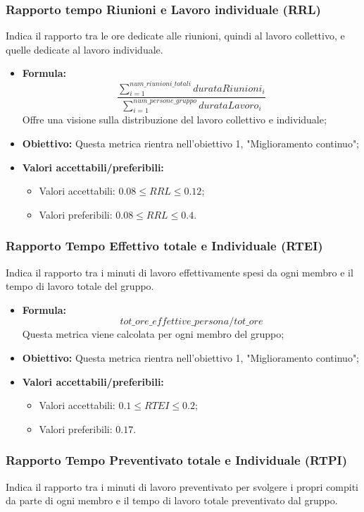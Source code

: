 \subsubsection{Rapporto tempo Riunioni e Lavoro individuale (RRL)}
Indica il rapporto tra le ore dedicate alle riunioni, quindi al lavoro collettivo, e quelle dedicate al lavoro individuale.
\begin{itemize}
	\item \textbf{Formula:}\[\dfrac{\sum_{i=1}^{num\_riunioni\_totali} durataRiunioni_i}{\sum_{i=1}^{num\_persone\_gruppo} durataLavoro_i}\]
	Offre una visione sulla distribuzione del lavoro collettivo e individuale;
	\item \textbf{Obiettivo:} Questa metrica rientra nell'obiettivo 1, "Miglioramento continuo";
	\item \textbf{Valori accettabili/preferibili: }
		\begin{itemize}
			\item Valori accettabili: $0.08 \leq RRL \leq 0.12$;
			\item Valori preferibili: $0.08 \leq RRL \leq 0.4$.
		\end{itemize}
\end{itemize}

\subsubsection{Rapporto Tempo Effettivo totale e Individuale (RTEI)}
Indica il rapporto tra i minuti di lavoro effettivamente spesi da ogni membro e il tempo di lavoro totale del gruppo.
\begin{itemize}
	\item \textbf{Formula:}\[tot\_ore\_effettive\_persona / tot\_ore
	\]Questa metrica viene calcolata per ogni membro del gruppo;
	\item \textbf{Obiettivo:} Questa metrica rientra nell'obiettivo 1, "Miglioramento continuo";
	\item \textbf{Valori accettabili/preferibili: }
	\begin{itemize}
		\item Valori accettabili: $0.1 \leq RTEI \leq 0.2$;
		\item Valori preferibili: $0.17$.
	\end{itemize}
\end{itemize}

\subsubsection{Rapporto Tempo Preventivato totale e Individuale (RTPI)}
Indica il rapporto tra i minuti di lavoro preventivato per svolgere i propri compiti da parte di ogni membro e il tempo di lavoro totale preventivato dal gruppo.

